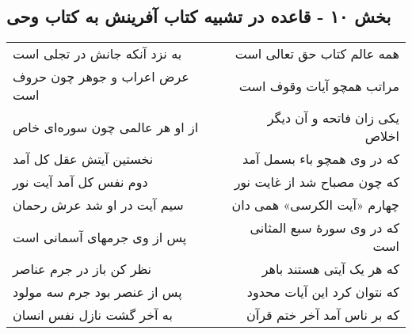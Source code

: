 \begin{center}
\section*{بخش ۱۰ - قاعده در تشبیه کتاب آفرینش به کتاب وحی}
\label{sec:sh010}
\begin{longtable}{l p{0.5cm} r}
به نزد آنکه جانش در تجلی است
&&
همه عالم کتاب حق تعالی است
\\
عرض اعراب و جوهر چون حروف است
&&
مراتب همچو آیات وقوف است
\\
از او هر عالمی چون سوره‌ای خاص
&&
یکی زان فاتحه و آن دیگر اخلاص
\\
نخستین آیتش عقل کل آمد
&&
که در وی همچو باء بسمل آمد
\\
دوم نفس کل آمد آیت نور
&&
که چون مصباح شد از غایت نور
\\
سیم آیت در او شد عرش رحمان
&&
چهارم «آیت الکرسی» همی دان
\\
پس از وی جرمهای آسمانی است
&&
که در وی سورهٔ سبع المثانی است
\\
نظر کن باز در جرم عناصر
&&
که هر یک آیتی هستند باهر
\\
پس از عنصر بود جرم سه مولود
&&
که نتوان کرد این آیات محدود
\\
به آخر گشت نازل نفس انسان
&&
که بر ناس آمد آخر ختم قرآن
\\
\end{longtable}
\end{center}
